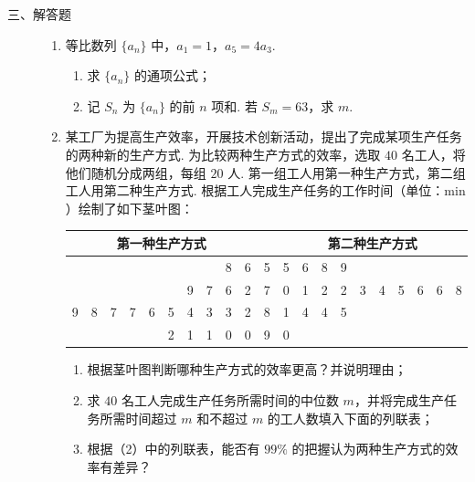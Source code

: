 \begin{description}

    \item[三、解答题]

    \begin{enumerate}[leftmargin=5pt]

      \addtocounter{enumi}{+16}

        \item 等比数列 \(\{a_n\}\) 中，\(a_1=1\)，\(a_5=4a_3\).

\begin{enumerate}
    \item 求 \(\{a_n\}\) 的通项公式；
    \item 记 \(S_n\) 为 \(\{a_n\}\) 的前 \(n\) 项和. 若 \(S_m=63\)，求 \(m\).
\end{enumerate}

        \item 某工厂为提高生产效率，开展技术创新活动，提出了完成某项生产任务的两种新的生产方式. 为比较两种生产方式的效率，选取 \(40\) 名工人，将他们随机分成两组，每组 \(20\) 人. 第一组工人用第一种生产方式，第二组工人用第二种生产方式. 根据工人完成生产任务的工作时间（单位：\(\mathrm{min}\)）绘制了如下茎叶图：

\begin{center}
\begin{tabular}{rrrrrrrrrr|c|llllllllll}
\multicolumn{10}{c|}{第一种生产方式} & & \multicolumn{10}{c}{第二种生产方式} \\
\hline
 &  &  &  &  &  &  &  & 8 & 6 & 5 & 5 & 6 & 8 & 9 &  &  &  &  &  \\
 &  &  &  &  &  & 9 & 7 & 6 & 2 & 7 & 0 & 1 & 2 & 2 & 3 & 4 & 5 & 6 & 6 & 8 \\
9 & 8 & 7 & 7 & 6 & 5 & 4 & 3 & 3 & 2 & 8 & 1 & 4 & 4 & 5 &  &  &  &  &  \\
 &  &  &  &  & 2 & 1 & 1 & 0 & 0 & 9 & 0 &  &  &  &  &  &  &  &  \\
\end{tabular}
\end{center}

\begin{enumerate}
    \item 根据茎叶图判断哪种生产方式的效率更高？并说明理由；
    \item 求 \(40\) 名工人完成生产任务所需时间的中位数 \(m\)，并将完成生产任务所需时间超过 \(m\) 和不超过 \(m\) 的工人数填入下面的列联表；
    \item 根据（2）中的列联表，能否有 \(99\%\) 的把握认为两种生产方式的效率有差异？
\end{enumerate}


\end{enumerate}
\end{description}

